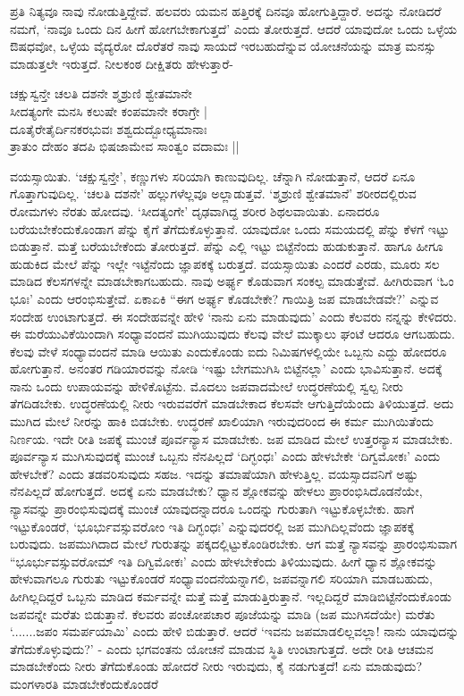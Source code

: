ಪ್ರತಿ ನಿತ್ಯವೂ ನಾವು ನೋಡುತ್ತಿದ್ದೇವೆ. ಹಲವರು ಯಮನ ಹತ್ತಿರಕ್ಕೆ ದಿನವೂ ಹೋಗುತ್ತಿದ್ದಾರೆ. ಅದನ್ನು ನೋಡಿದರೆ ನಮಗೆ, `ನಾವೂ ಒಂದು ದಿನ ಹೀಗೆ ಹೋಗಬೇಕಾಗುತ್ತದೆ' ಎಂದು ತೋರುತ್ತದೆ. ಆದರೆ ಯಾವುದೋ ಒಂದು ಒಳ್ಳೆಯ ಔಷಧವೋ, ಒಳ್ಳೆಯ ವೈದ್ಯರೋ ದೊರೆತರೆ ನಾವು ಸಾಯದೆ ಇರಬಹುದೆನ್ನುವ ಯೋಚನೆಯನ್ನು ಮಾತ್ರ ಮನಸ್ಸು ಮಾಡುತ್ತಲೇ ಇರುತ್ತದೆ. ನೀಲಕಂಠ ದೀಕ್ಷಿತರು ಹೇಳುತ್ತಾರೆ-

\begin{shloka}
ಚಕ್ಷುಸ್ವನ್ತೇ ಚಲತಿ ದಶನೇ ಶ್ಮಶ್ರುಣಿ ಶ್ವೇತಮಾನೇ\\
ಸೀದತ್ಯಂಗೇ ಮನಸಿ ಕಲುಷೇ ಕಂಪಮಾನೇ ಕರಾಗ್ರೇ |\\
ದೂತೈರೇತೈರ್ದಿನಕರಭುವಃ ಶಶ್ವದುದ್ಬೋಧ್ಯಮಾನಾಃ\\
ತ್ರಾತುಂ ದೇಹಂ ತದಪಿ ಭಿಷಜಾಮೇವ ಸಾಂತ್ವಂ ವದಾಮಃ ||
\end{shloka}

ವಯಸ್ಸಾಯಿತು. `ಚಕ್ಷುಸ್ವನ್ತೇ', ಕಣ್ಣುಗಳು ಸರಿಯಾಗಿ ಕಾಣುವುದಿಲ್ಲ. ಚೆನ್ನಾಗಿ ನೋಡುತ್ತಾನೆ, ಆದರೆ ಏನೂ ಗೊತ್ತಾಗುವುದಿಲ್ಲ. `ಚಲತಿ ದಶನೇ' ಹಲ್ಲುಗಳೆಲ್ಲವೂ ಅಲ್ಲಾಡುತ್ತವೆ. `ಶ್ಮಶ್ರುಣಿ ಶ್ವೇತಮಾನೆ' ಶರೀರದಲ್ಲಿರುವ ರೋಮಗಳು ನೆರತು ಹೋದವು. `ಸೀದತ್ಯಂಗೇ' ದೃಢವಾಗಿದ್ದ ಶರೀರ ಶಿಥಲವಾಯಿತು. ಏನಾದರೂ ಬರೆಯಬೇಕೆಂದುಕೊಂಡಾಗ ಪೆನ್ನು ಕೈಗೆ ತೆಗೆದುಕೊಳ್ಳುತ್ತಾನೆ. ಯಾವುದೋ ಒಂದು ಸಮಯದಲ್ಲಿ ಪೆನ್ನು ಕೆಳಗೆ ಇಟ್ಟು ಬಿಡುತ್ತಾನೆ. ಮತ್ತೆ ಬರೆಯಬೇಕೆಂದು ತೋರುತ್ತದೆ. ಪೆನ್ನು ಎಲ್ಲಿ ಇಟ್ಟು ಬಿಟ್ಟೆನೆಂದು ಹುಡುಕುತ್ತಾನೆ. ಹಾಗೂ ಹೀಗೂ ಹುಡುಕಿದ ಮೇಲೆ ಪೆನ್ನು ಇಲ್ಲೇ ಇಟ್ಟೆನೆಂದು ಜ್ಞಾಪಕಕ್ಕೆ ಬರುತ್ತದೆ. ವಯಸ್ಸಾಯಿತು ಎಂದರೆ ಎರಡು, ಮೂರು ಸಲ ಮಾಡಿದ ಕೆಲಸಗಳನ್ನೇ ಮಾಡಬೇಕಾಗಬಹುದು. ನಾವು ಅರ್ಘ್ಯ ಕೊಡುವಾಗ ಸಂಕಲ್ಪ ಮಾಡುತ್ತೇವೆ. ಹೀಗಿರುವಾಗ `ಓಂ ಭೂಃ' ಎಂದು ಆರಂಭಿಸುತ್ತೇವೆ. ಏಕಾಏಕಿ ``ಈಗ ಅರ್ಘ್ಯ ಕೊಡಬೇಕೇ? ಗಾಯಿತ್ರಿ ಜಪ ಮಾಡಬೇಡವೇ?' ಎನ್ನುವ ಸಂದೇಹ ಉಂಟಾಗುತ್ತದೆ. ಈ ಸಂದೇಹವನ್ನೇ ಹೇಳಿ `ನಾನು ಏನು ಮಾಡುವುದು' ಎಂದು ಕೆಲವರು ನನ್ನನ್ನು ಕೇಳಿದರು. ಈ ಮರೆಯುವಿಕೆಯಿಂದಾಗಿ ಸಂಧ್ಯಾವಂದನೆ ಮುಗಿಯುವುದು ಕೆಲವು ವೇಲೆ ಮುಕ್ಕಾಲು ಘಂಟೆ ಆದರೂ ಆಗಬಹುದು. ಕೆಲವು ವೇಳೆ ಸಂಧ್ಯಾವಂದನೆ ಮಾಡಿ ಆಯಿತು ಎಂದುಕೊಂಡು ಐದು ನಿಮಿಷಗಳಲ್ಲಿಯೇ ಒಬ್ಬನು ಎದ್ದು ಹೋದರೂ ಹೋಗುತ್ತಾನೆ. ಅನಂತರ ಗಡಿಯಾರವನ್ನು ನೋಡಿ `ಇಷ್ಟು ಬೇಗಮುಗಿಸಿ ಬಿಟ್ಟೆನಲ್ಲಾ' ಎಂದು ಭಾವಿಸುತ್ತಾನೆ. ಅದಕ್ಕೆ ನಾನು ಒಂದು ಉಪಾಯವನ್ನು ಹೇಳಿಕೊಟ್ಟೆನು. ಮೊದಲು ಜಪವಾದಮೇಲೆ ಉದ್ಧರಣೆಯಲ್ಲಿ ಸ್ವಲ್ಪ ನೀರು ತೆಗದಿಡಬೇಕು. ಉದ್ಧರಣೆಯಲ್ಲಿ ನೀರು ಇರುವವರೆಗೆ ಮಾಡಬೇಕಾದ ಕೆಲಸವೇ ಆಗುತ್ತಿದೆಯೆಂದು ತಿಳಿಯುತ್ತದೆ. ಅದು ಮುಗಿದ ಮೇಲೆ ನೀರನ್ನು ಹಾಕಿ ಬಿಡಬೇಕು. ಉದ್ಧರಣೆ ಖಾಲಿಯಾಗಿ ಇರುವುದರಿಂದ ಈ ಕರ್ಮ ಮುಗಿಯಿತೆಂದು ನಿರ್ಣಯ. ಇದೇ ರೀತಿ ಜಪಕ್ಕೆ ಮುಂಚೆ ಪೂರ್ವನ್ಯಾಸ ಮಾಡಬೇಕು. ಜಪ ಮಾಡಿದ ಮೇಲೆ ಉತ್ತರನ್ಯಾಸ ಮಾಡಬೇಕು. ಪೂರ್ವನ್ಯಾಸ ಮುಗಿಸುವುದಕ್ಕೆ ಮುಂಚೆ ಒಬ್ಬನು ನೆನಪಿಲ್ಲದೆ `ದಿಗ್ಭಂಧಃ' ಎಂದು ಹೇಳಬೇಕೇ `ದಿಗ್ವಮೋಕಃ' ಎಂದು ಹೇಳಬೇಕೆ? ಎಂದು ತಡವರಿಸುವುದು ಸಹಜ. ಇದನ್ನು ತಮಾಷೆಯಾಗಿ ಹೇಳುತ್ತಿಲ್ಲ. ವಯಸ್ಸಾದವನಿಗೆ ಅಷ್ಟು ನೆನಪಿಲ್ಲದೆ ಹೋಗುತ್ತದೆ. ಅದಕ್ಕೆ ಏನು ಮಾಡಬೇಕು? ಧ್ಯಾನ ಶ್ಲೋಕವನ್ನು ಹೇಳಲು ಪ್ರಾರಂಭಿಸಿದೊಡನೆಯೇ, ನ್ಯಾಸವನ್ನು ಪ್ರಾರಂಭಿಸುವುದಕ್ಕೆ ಮುಂಚೆ ಯಾವುದನ್ನಾದರೂ ಒಂದನ್ನು ಗುರುತಾಗಿ ಇಟ್ಟುಕೊಳ್ಳಬೇಕು. ಹಾಗೆ ಇಟ್ಟುಕೊಂಡರೆ, `ಭೂರ್ಭುವಸ್ಸುವರೋಂ ಇತಿ ದಿಗ್ಭಂಧಃ' ಎನ್ನುವುದರಲ್ಲಿ ಜಪ ಮುಗಿದಿಲ್ಲವೆಂದು ಜ್ಞಾಪಕಕ್ಕೆ ಬರುವುದು. ಜಪಮುಗಿದಾದ ಮೇಲೆ ಗುರುತನ್ನು ಪಕ್ಕದಲ್ಲಿಟ್ಟುಕೊಂಡಿರಬೇಕು. ಆಗ ಮತ್ತೆ ನ್ಯಾಸವನ್ನು ಪ್ರಾರಂಭಿಸುವಾಗ ``ಭೂರ್ಭುವಸ್ಸುವರೋಮ್ ಇತಿ ದಿಗ್ವಿಮೋಕಃ' ಎಂದು ಹೇಳಬೇಕೆಂದು ತಿಳಿಯುವುದು. ಹೀಗೆ ಧ್ಯಾನ ಶ್ಲೋಕವನ್ನು ಹೇಳುವಾಗಲೂ ಗುರುತು ಇಟ್ಟುಕೊಂಡರೆ ಸಂಧ್ಯಾವಂದನೆಯನ್ನಾಗಲಿ, ಜಪವನ್ನಾಗಲಿ ಸರಿಯಾಗಿ ಮಾಡಬಹುದು, ಹೀಗಿಲ್ಲದಿದ್ದರೆ ಒಬ್ಬನು ಮಾಡಿದ ಕರ್ಮವನ್ನೇ ಮತ್ತೆ ಮತ್ತೆ ಮಾಡುತ್ತಿರುತ್ತಾನೆ. ಇಲ್ಲದಿದ್ದರೆ ಮಾಡಿಬಿಟ್ಟೆನೆಂದುಕೊಂಡು ಜಪವನ್ನೇ ಮರೆತು ಬಿಡುತ್ತಾನೆ. ಕೆಲವರು ಪಂಚೋಪಚಾರ ಪೂಜೆಯನ್ನು ಮಾಡಿ (ಜಪ ಮುಗಿಸದೆಯೇ) ಮರೆತು `.......ಜಪಂ ಸಮರ್ಪಯಾಮಿ' ಎಂದು ಹೇಳಿ ಬಿಡುತ್ತಾರೆ. ಆದರೆ `ಇವನು ಜಪಮಾಡಲಿಲ್ಲವಲ್ಲಾ! ನಾನು ಯಾವುದನ್ನು ತೆಗೆದುಕೊಳ್ಳುವುದು?' - ಎಂದು ಭಗವಂತನು ಯೋಚನೆ ಮಾಡುವ ಸ್ಥಿತಿ ಉಂಟಾಗುತ್ತದೆ. ಅದೇ ರೀತಿ ಆಚಮನ ಮಾಡಬೇಕೆಂದು ನೀರು ತೆಗೆದುಕೊಂಡು ಹೋದರೆ ನೀರು ಇರುವುದು, ಕೈ ನಡುಗುತ್ತದೆ! ಏನು ಮಾಡುವುದು? ಮಂಗಳಾರತಿ ಮಾಡಬೇಕೆಂದುಕೊಂಡರೆ 